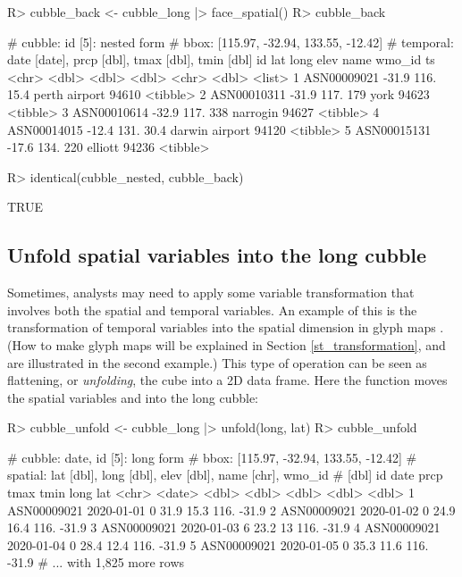 \documentclass[
]{jss}
\begin{document}
\begin{CodeChunk}
\begin{CodeInput}
R> cubble_back <- cubble_long |> face_spatial()
R> cubble_back
\end{CodeInput}
\begin{CodeOutput}
# cubble:   id [5]: nested form
# bbox:     [115.97, -32.94, 133.55, -12.42]
# temporal: date [date], prcp [dbl], tmax [dbl], tmin [dbl]
  id            lat  long  elev name           wmo_id ts      
  <chr>       <dbl> <dbl> <dbl> <chr>           <dbl> <list>  
1 ASN00009021 -31.9  116.  15.4 perth airport   94610 <tibble>
2 ASN00010311 -31.9  117. 179   york            94623 <tibble>
3 ASN00010614 -32.9  117. 338   narrogin        94627 <tibble>
4 ASN00014015 -12.4  131.  30.4 darwin airport  94120 <tibble>
5 ASN00015131 -17.6  134. 220   elliott         94236 <tibble>
\end{CodeOutput}
\begin{CodeInput}
R> identical(cubble_nested, cubble_back)
\end{CodeInput}
\begin{CodeOutput}
[1] TRUE
\end{CodeOutput}
\end{CodeChunk}

\hypertarget{unfold}{%
\subsection{Unfold spatial variables into the long cubble}\label{unfold}}

Sometimes, analysts may need to apply some variable transformation that involves both the spatial and temporal variables. An example of this is the transformation of temporal variables into the spatial dimension in glyph maps \citep{Wickham2012-yr}. (How to make glyph maps will be explained in Section \ref{st_transformation}, and are illustrated in the second example.) This type of operation can be seen as flattening, or \emph{unfolding}, the cube into a 2D data frame. Here the function  moves the spatial variables  and  into the long cubble:

\begin{CodeChunk}
\begin{CodeInput}
R> cubble_unfold <- cubble_long |> unfold(long, lat)
R> cubble_unfold
\end{CodeInput}
\begin{CodeOutput}
# cubble:  date, id [5]: long form
# bbox:    [115.97, -32.94, 133.55, -12.42]
# spatial: lat [dbl], long [dbl], elev [dbl], name [chr], wmo_id
#   [dbl]
  id          date        prcp  tmax  tmin  long   lat
  <chr>       <date>     <dbl> <dbl> <dbl> <dbl> <dbl>
1 ASN00009021 2020-01-01     0  31.9  15.3  116. -31.9
2 ASN00009021 2020-01-02     0  24.9  16.4  116. -31.9
3 ASN00009021 2020-01-03     6  23.2  13    116. -31.9
4 ASN00009021 2020-01-04     0  28.4  12.4  116. -31.9
5 ASN00009021 2020-01-05     0  35.3  11.6  116. -31.9
# ... with 1,825 more rows
\end{CodeOutput}
\end{CodeChunk}
\end{document}
